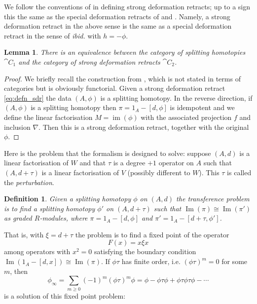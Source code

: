 \documentclass[english,letter paper,12pt,leqno]{article}
\newtheorem{lemma}[theorem]{Lemma}
\theoremstyle{example}
\newtheorem{definition}[theorem]{Definition}
\numberwithin{equation}{section}
\def\im{\operatorname{Im}}
\begin{document}
We follow the conventions of \cite{barneslambe} in defining strong deformation retracts; up to a sign this the same as the special deformation retracts of \cite{crainic} and \cite{dm1102.2957}. Namely, a strong deformation retract in the above sense is the same as a special deformation retract in the sense of \emph{ibid.} with $h = - \phi$.

\begin{lemma}\label{lemma:equivocate} There is an equivalence between the category of splitting homotopies $\cat{C}_1$ and the category of  strong deformation retracts $\cat{C}_2$.
\end{lemma}
\begin{proof}
We briefly recall the construction from \cite[p.883]{barneslambe}, which is not stated in terms of categories but is obviously functorial. Given a strong deformation retract \eqref{eq:defn_sdr} the data $(A, \phi)$ is a splitting homotopy. In the reverse direction, if $(A, \phi)$ is a splitting homotopy then $\pi = 1_A - [d, \phi]$ is idempotent and we define the linear factorisation $M = \operatorname{im}(\phi)$ with the associated projection $f$ and inclusion $\nabla$. Then this is a strong deformation retract, together with the original $\phi$.
\end{proof}

Here is the problem that the formalism is designed to solve: suppose $(A,d)$ is a linear factorisation of $W$ and that $\tau$ is a degree $+1$ operator on $A$ such that $(A, d + \tau)$ is a linear factorisation of $V$ (possibly different to $W$). This $\tau$ is called the \emph{perturbation}.

\begin{definition} Given a splitting homotopy $\phi$ on $(A,d)$ the \emph{transference problem} is to find a splitting homotopy $\phi'$ on $(A, d + \tau)$ such that $\im(\pi) \cong \im(\pi')$ as graded $R$-modules, where $\pi = 1_A - [d, \phi]$ and $\pi' = 1_A - [d + \tau, \phi']$. 
\end{definition}

That is, with $\xi = d + \tau$ the problem is to find a fixed point of the operator
\[
F(x) = x \xi x
\]
among operators with $x^2 = 0$ satisfying the boundary condition $\im(1_A - [d,x]) \cong \im(\pi)$. If $\phi \tau$ has finite order, i.e. $(\phi \tau)^m = 0$ for some $m$, then
\[
\phi_\infty = \sum_{m \ge 0} (-1)^m (\phi \tau)^m \phi = \phi - \phi \tau \phi + \phi \tau \phi \tau \phi - \cdots
\]
is a solution of this fixed point problem:
\end{document}
